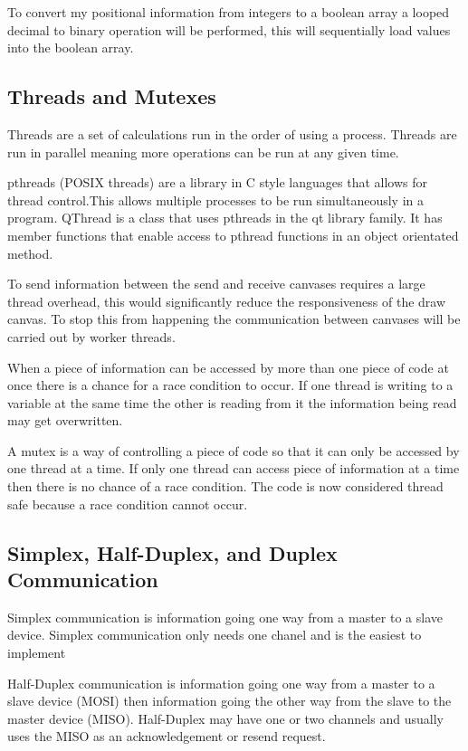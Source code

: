 \documentclass[10pt]{article}
\begin{document}
\begin{multicols*}{2}
To convert my positional information from integers to a boolean array a looped decimal to binary operation will be performed, this will sequentially load values into the boolean array.

\subsection{Threads and Mutexes}
Threads are a set of calculations run in the order of using a process. Threads are run in parallel meaning more operations can be run at any given time.

pthreads (POSIX threads) are a library in C style languages that allows for thread control.This allows multiple processes to be run simultaneously in a program. QThread is a class that uses pthreads in the qt library family. It has member functions that enable access to pthread functions in an object orientated method. 

To send information between the send and receive canvases requires a large thread overhead, this would significantly reduce the responsiveness of the draw canvas. To stop this from happening the communication between canvases will be carried out by worker threads.

When a piece of information can be accessed by more than one piece of code at once there is a chance for a race condition to occur. If one thread is writing to a variable at the same time the other is reading from it the information being read may get overwritten.

A mutex is a way of controlling a piece of code so that it can only be accessed by one thread at a time. If only one thread can access piece of information at a time then there is no chance of a race condition. The code is now considered thread safe because a race condition cannot occur.

\subsection{Simplex, Half-Duplex, and Duplex Communication}
Simplex communication is information going one way from a master to a slave device. Simplex communication only needs one chanel and is the easiest to implement

Half-Duplex communication is information going one way from a master to a slave device (MOSI) then information going the other way from the slave to the master device (MISO). Half-Duplex may have one or two channels and usually uses the MISO as an acknowledgement or resend request.


\end{multicols*}
\end{document}
